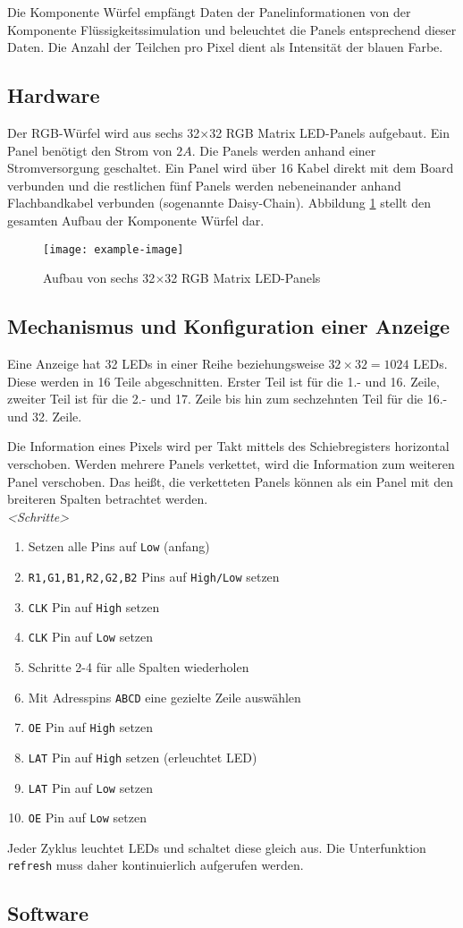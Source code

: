 Die Komponente Würfel empfängt Daten der Panelinformationen von der Komponente Flüssigkeitssimulation und beleuchtet die Panels entsprechend dieser Daten. Die Anzahl der Teilchen pro Pixel dient als Intensität der blauen Farbe.

\subsection{Hardware}
Der RGB-Würfel wird aus sechs 32$\times$32 RGB Matrix LED-Panels aufgebaut. Ein Panel benötigt den Strom von $2A$. Die Panels werden anhand einer Stromversorgung geschaltet. Ein Panel wird über 16 Kabel direkt mit dem Board verbunden und die restlichen fünf Panels werden nebeneinander anhand Flachbandkabel verbunden (sogenannte Daisy-Chain). Abbildung \ref{fig:assembly:dice} stellt den gesamten Aufbau der Komponente Würfel dar.
\begin{figure}
	\centering
	\texttt{[image: example-image]}
	\caption{Aufbau von sechs 32$\times$32 RGB Matrix LED-Panels}
	\label{fig:assembly:dice}
\end{figure}

\subsection{Mechanismus und Konfiguration einer Anzeige}
Eine Anzeige hat 32 LEDs in einer Reihe beziehungsweise $32 \times 32 = 1024$ LEDs. Diese werden in 16 Teile abgeschnitten. Erster Teil ist für die 1.- und 16. Zeile, zweiter Teil ist für die 2.- und 17. Zeile bis hin zum sechzehnten Teil für die 16.- und 32. Zeile.

Die Information eines Pixels wird per Takt mittels des Schiebregisters horizontal verschoben. Werden mehrere Panels verkettet, wird die Information zum weiteren Panel verschoben. Das heißt, die verketteten Panels können als ein Panel mit den breiteren Spalten betrachtet werden. \\

\emph{<Schritte>}
\begin{enumerate}
	\item Setzen alle Pins auf \texttt{Low} (anfang)
	\item \texttt{R1,G1,B1,R2,G2,B2} Pins auf \texttt{High/Low} setzen
	\item \texttt{CLK} Pin auf \texttt{High} setzen
	\item \texttt{CLK} Pin auf \texttt{Low} setzen
	\item Schritte 2-4 für alle Spalten wiederholen
	\item Mit Adresspins \texttt{ABCD} eine gezielte Zeile auswählen
	\item \texttt{OE} Pin auf \texttt{High} setzen
	\item \texttt{LAT} Pin auf \texttt{High} setzen (erleuchtet LED)
	\item \texttt{LAT} Pin auf \texttt{Low} setzen
	\item \texttt{OE} Pin auf \texttt{Low} setzen
\end{enumerate}

Jeder Zyklus leuchtet LEDs und schaltet diese gleich aus. Die Unterfunktion \texttt{refresh} muss daher kontinuierlich aufgerufen werden.

\subsection{Software}